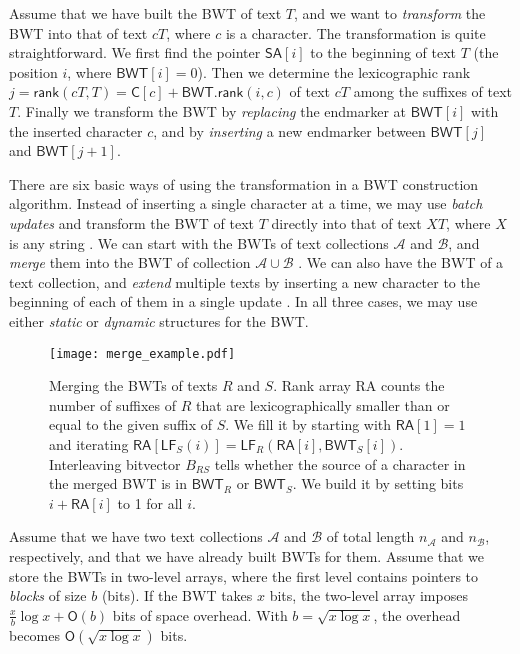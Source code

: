 \documentclass[smallabstract,smallcaptions]{dccpaper}
\newcommand{\Oh}{\ensuremath{\mathsf{O}}}
\newcommand{\BWT}{\textsf{BWT}}
\newcommand{\RA}{\textsf{RA}}
\newcommand{\mSA}{\ensuremath{\mathsf{SA}}}
\newcommand{\mBWT}{\ensuremath{\mathsf{BWT}}}
\newcommand{\mC}{\ensuremath{\mathsf{C}}}
\newcommand{\mRA}{\ensuremath{\mathsf{RA}}}
\newcommand{\mLF}{\ensuremath{\mathsf{LF}}}
\newcommand{\mrank}{\ensuremath{\mathsf{rank}}}
\newcommand{\Acoll}{\ensuremath{\mathcal{A}}}
\newcommand{\Bcoll}{\ensuremath{\mathcal{B}}}
\begin{document}
Assume that we have built the \BWT{} of text $T$, and we want to \emph{transform} the \BWT{} into that of text $cT$, where $c$ is a character. The transformation \cite{Hon2007} is quite straightforward. We first find the pointer $\mSA[i]$ to the beginning of text $T$ (the position $i$, where $\mBWT[i] = 0$). Then we determine the lexicographic rank $j = \mrank(cT, T) = \mC[c] + \mBWT.\mrank(i, c)$ of text $cT$ among the suffixes of text $T$. Finally we transform the \BWT{} by \emph{replacing} the endmarker at $\mBWT[i]$ with the inserted character $c$, and by \emph{inserting} a new endmarker between $\mBWT[j]$ and $\mBWT[j+1]$.

There are six basic ways of using the transformation in a \BWT{} construction algorithm. Instead of inserting a single character at a time, we may use \emph{batch updates} and transform the \BWT{} of text $T$ directly into that of text $XT$, where $X$ is any string \cite{Hon2007}. We can start with the \BWT{}s of text collections $\Acoll$ and $\Bcoll$, and \emph{merge} them into the \BWT{} of collection $\Acoll \cup \Bcoll$ \cite{Siren2009}. We can also have the \BWT{} of a text collection, and \emph{extend} multiple texts by inserting a new character to the beginning of each of them in a single update \cite{Bauer2013}. In all three cases, we may use either \emph{static} or \emph{dynamic} \cite{Chan2007} structures for the \BWT.


\Section{Merging \BWT{}s of text collections}

\begin{figure}[t!]
\texttt{[image: merge\_example.pdf]}
\caption{Merging the \BWT{}s of texts $R$ and $S$. Rank array \RA{} counts the number of suffixes of $R$ that are lexicographically smaller than or equal to the given suffix of $S$. We fill it by starting with $\mRA[1] = 1$ and iterating $\mRA[\mLF_{S}(i)] = \mLF_{R}(\mRA[i], \mBWT_{S}[i])$. Interleaving bitvector $B_{RS}$ tells whether the source of a character in the merged \BWT{} is in $\mBWT_{R}$ or $\mBWT_{S}$. We build it by setting bits $i+\mRA[i]$ to 1 for all $i$.}\label{fig:merge}
\end{figure}

Assume that we have two text collections $\Acoll$ and $\Bcoll$ of total length $n_{\Acoll}$ and $n_{\Bcoll}$, respectively, and that we have already built \BWT{}s for them. Assume that we store the \BWT{}s in two-level arrays, where the first level contains pointers to \emph{blocks} of size $b$ (bits). If the \BWT{} takes $x$ bits, the two-level array imposes $\frac{x}{b} \log x + \Oh(b)$ bits of space overhead. With $b = \sqrt{x \log x}$, the overhead becomes $\Oh(\sqrt{x \log x})$ bits.
\end{document}
